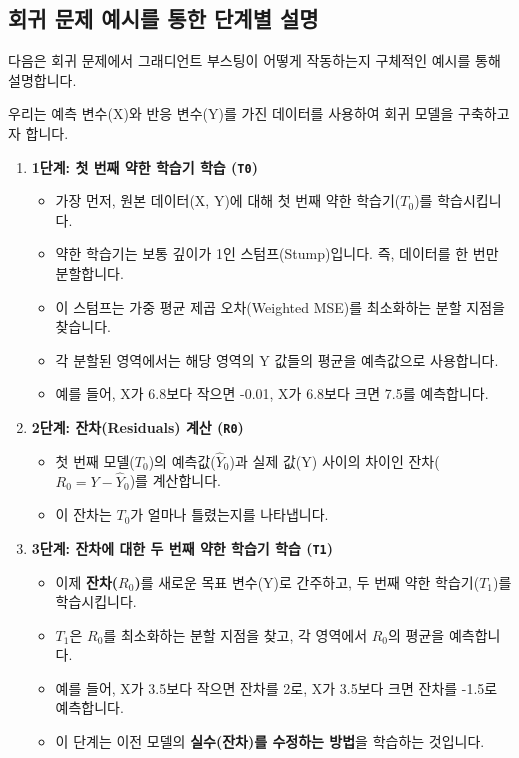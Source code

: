 \documentclass[11pt,a4paper]{article}
\begin{document}
\subsection{회귀 문제 예시를 통한 단계별 설명}
다음은 회귀 문제에서 그래디언트 부스팅이 어떻게 작동하는지 구체적인 예시를 통해 설명합니다.

\begin{examplebox}[회귀 문제 예시]
우리는 예측 변수(X)와 반응 변수(Y)를 가진 데이터를 사용하여 회귀 모델을 구축하고자 합니다.

\begin{enumerate}
    \item \textbf{1단계: 첫 번째 약한 학습기 학습 (\texttt{T0})}
    \begin{itemize}
        \item 가장 먼저, 원본 데이터(X, Y)에 대해 첫 번째 약한 학습기($T_0$)를 학습시킵니다.
        \item 약한 학습기는 보통 깊이가 1인 스텀프(Stump)입니다. 즉, 데이터를 한 번만 분할합니다.
        \item 이 스텀프는 가중 평균 제곱 오차(Weighted MSE)를 최소화하는 분할 지점을 찾습니다.
        \item 각 분할된 영역에서는 해당 영역의 Y 값들의 평균을 예측값으로 사용합니다.
        \item 예를 들어, X가 6.8보다 작으면 -0.01, X가 6.8보다 크면 7.5를 예측합니다.
    \end{itemize}

    \item \textbf{2단계: 잔차(Residuals) 계산 (\texttt{R0})}
    \begin{itemize}
        \item 첫 번째 모델($T_0$)의 예측값($\hat{Y}_0$)과 실제 값(Y) 사이의 차이인 잔차($R_0 = Y - \hat{Y}_0$)를 계산합니다.
        \item 이 잔차는 $T_0$가 얼마나 틀렸는지를 나타냅니다.
    \end{itemize}

    \item \textbf{3단계: 잔차에 대한 두 번째 약한 학습기 학습 (\texttt{T1})}
    \begin{itemize}
        \item 이제 \textbf{잔차($R_0$)}를 새로운 목표 변수(Y)로 간주하고, 두 번째 약한 학습기($T_1$)를 학습시킵니다.
        \item $T_1$은 $R_0$를 최소화하는 분할 지점을 찾고, 각 영역에서 $R_0$의 평균을 예측합니다.
        \item 예를 들어, X가 3.5보다 작으면 잔차를 2로, X가 3.5보다 크면 잔차를 -1.5로 예측합니다.
        \item 이 단계는 이전 모델의 \textbf{실수(잔차)를 수정하는 방법}을 학습하는 것입니다.
    \end{itemize}


\end{enumerate}
\end{examplebox}
\end{document}
